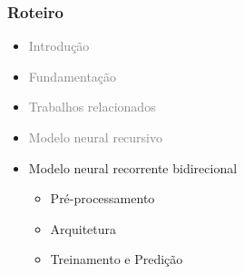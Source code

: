 \documentclass[10pt]{beamer}
\begin{document}
\begin{frame}
  \frametitle{Roteiro}


  \begin{itemize}


    
    \item[\color{gray}{$\bullet$}] \textcolor{gray}{Introdução}
    
    
    \item[\color{gray}{$\bullet$}] \textcolor{gray}{Fundamentação}


    
    \item[\color{gray}{$\bullet$}] \textcolor{gray}{Trabalhos relacionados}

    
    \item[\color{gray}{$\bullet$}] \textcolor{gray}{Modelo neural recursivo}

    
    \item Modelo neural recorrente bidirecional
    \begin{itemize}
      \item[\ ] Pré-processamento
      \item[\ ] Arquitetura
      \item[\ ] Treinamento e Predição
    \end{itemize}



\end{itemize}
\end{frame}
\end{document}
